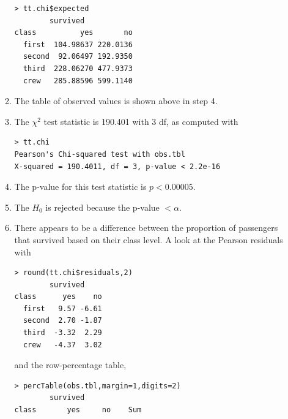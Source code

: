 \documentclass[10pt,openany]{book}\usepackage[]{graphicx}\usepackage[]{color}
\makeatletter
\newenvironment{kframe}{%
 \def\at@end@of@kframe{}%
 \ifinner\ifhmode%
  \def\at@end@of@kframe{\end{minipage}}%
  \begin{minipage}{\columnwidth}%
 \fi\fi%
 \def\FrameCommand##1{\hskip\@totalleftmargin \hskip-\fboxsep
 \colorbox{shadecolor}{##1}\hskip-\fboxsep
     \hskip-\linewidth \hskip-\@totalleftmargin \hskip\columnwidth}%
 \MakeFramed {\advance\hsize-\width
   \@totalleftmargin\z@ \linewidth\hsize
   \@setminipage}}%
 {\par\unskip\endMakeFramed%
 \at@end@of@kframe}
\newenvironment{knitrout}{}{} %
\makeatother
\begin{document}
\begin{itemize}
\begin{enumerate}
\begin{knitrout}
\color{fgcolor}\begin{kframe}
\begin{verbatim}
> tt.chi$expected
        survived
class          yes       no
  first  104.98637 220.0136
  second  92.06497 192.9350
  third  228.06270 477.9373
  crew   285.88596 599.1140
\end{verbatim}
\end{kframe}
\end{knitrout}
      \item The table of observed values is shown above in step 4.
      \item The $\chi^{2}$ test statistic is 190.401 with 3 df, as computed with
\begin{knitrout}
\color{fgcolor}\begin{kframe}
\begin{verbatim}
> tt.chi
Pearson's Chi-squared test with obs.tbl 
X-squared = 190.4011, df = 3, p-value < 2.2e-16
\end{verbatim}
\end{kframe}
\end{knitrout}
      \item The p-value for this test statistic is $p<0.00005$.
      \item The $H_{0}$ is rejected because the p-value $<\alpha$.
      \item There appears to be a difference between the proportion of passengers that survived based on their class level.  A look at the Pearson residuals with
\begin{knitrout}
\color{fgcolor}\begin{kframe}
\begin{verbatim}
> round(tt.chi$residuals,2)
        survived
class      yes    no
  first   9.57 -6.61
  second  2.70 -1.87
  third  -3.32  2.29
  crew   -4.37  3.02
\end{verbatim}
\end{kframe}
\end{knitrout}
and the row-percentage table,
\begin{knitrout}
\color{fgcolor}\begin{kframe}
\begin{verbatim}
> percTable(obs.tbl,margin=1,digits=2)
        survived
class       yes     no    Sum

\end{verbatim}
\end{kframe}
\end{knitrout}
\end{enumerate}
\end{itemize}
\end{document}

